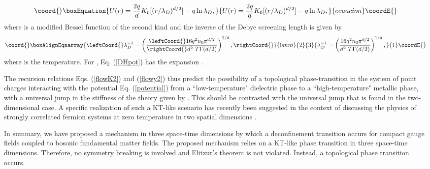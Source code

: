 \documentclass[a4paper,showpacs,preprintnumbers,amsmath,amssymb,prl,twocolumn]{revtex4}
\begin{document}
\begin{equation}\coord{}\boxEquation{
\label{DHpot}
U(r)=\frac{2q}{d}K_0[(r/\lambda_D)^{d/2}]-q\ln\lambda_D,
}{
U(r)=\frac{2q}{d}K_0[(r/\lambda_D)^{d/2}]-q\ln\lambda_D,
}{ecuacion}\coordE{}\end{equation}
where \coordHE{} is a modified Bessel function of the second kind and
 the inverse of the Debye screening length  \coordHE{} is given by
\begin{eqnarray}\coord{}\boxAlignEqnarray{\leftCoord{}
\lambda_D^{-1}=\left(\frac{\leftCoord{}16q^2n_0\pi^{d/2}}{\rightCoord{}d^2 ~T \Gamma(d/2)} \right)^{1/d},
\rightCoord{}}{0mm}{2}{3}{
\lambda_D^{-1}=\left(\frac{16q^2n_0\pi^{d/2}}{d^2 ~T \Gamma(d/2)} \right)^{1/d},
}{1}\coordE{}\end{eqnarray} 
where \coordHE{} is the temperature. For \coordHE{}, 
Eq. (\ref{DHpot}) has the expansion 
\coordHE{}.    

The recursion relations Eqs. (\ref{flowK2}) and (\ref{flowy2}) thus predict the 
possibility of a topological phase-transition in the system of point charges 
interacting with the potential Eq. (\ref{potential}) from a ``low-temperature" 
dielectric phase to a ``high-temperature" metallic phase, with a universal jump in the stiffness 
of the theory given by  \coordHE{}. This should be contrasted with
the universal jump \coordHE{} that is found in the two-dimensional
case. A specific realization of 
such a KT-like scenario has recently been suggested in the context of 
discussing the physics of strongly correlated fermion systems at zero
temperature in two spatial dimensions \cite{KNS}.

In summary, we have proposed a mechanism in three 
space-time dimensions by which a deconfinement 
transition occurs for \coordHE{} compact gauge fields coupled to 
bosonic fundamental matter fields. The proposed mechanism 
relies on a KT-like phase transition in three space-time dimensions. 
Therefore, no symmetry breaking is involved and Elitzur's theorem 
is not violated. Instead, a topological phase transition occurs.   
\end{document}

